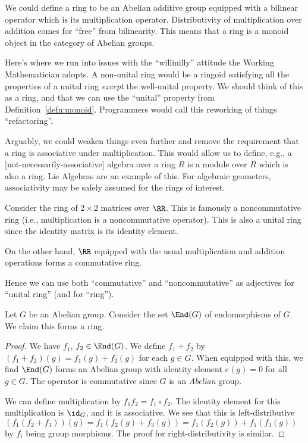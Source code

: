 \begin{remark}[Ring = Abelian additive group + multiplication]
We could define a ring to be an Abelian additive group equipped with a
bilinear operator which is its multiplication operator. Distributivity
of multiplication over addition comes for ``free'' from
bilinearity. This means that a ring is a monoid object in the category
of Abelian groups.
\end{remark}

\begin{remark}
Here's where we run into issues with the ``willinilly'' attitude the
Working Mathematician adopts. A non-unital ring would be a ringoid
satisfying all the properties of a unital ring \emph{except} the
well-unital property. We should think of this as a ring, and that
we can use the ``unital'' property from Definition~\ref{defn:monoid}.
Programmers would call this reworking of things ``refactoring''.

Arguably, we could weaken things even further and remove the
requirement that a ring is associative under multiplication. This
would allow us to define, e.g., a [not-necessarily-associative]
algebra over a ring $R$ is a module over $R$ which is also a ring.
Lie Algebras are an example of this. For algebraic geometers,
associativity may be safely assumed for the rings of interest.
\end{remark}

\begin{example}
Consider the ring of $2\times 2$ matrices over $\RR$. This is famously
a noncommutative ring (i.e., multiplication is a noncommutative operator).
This is also a unital ring since the identity matrix is its identity
element. 

On the other hand, $\RR$ equipped with the usual multiplication and
addition operations forms a commutative ring.

Hence we can use both ``commutative'' and ``noncommutative'' as
adjectives for ``unital ring'' (and for ``ring'').
\end{example}

\begin{example}
Let $G$ be an Abelian group.
Consider the set $\End(G)$ of endomorphisms of $G$. We claim this
forms a ring.

\begin{proof}
We have $f_{1}$, $f_{2}\in\End(G)$. We define $f_{1}+f_{2}$ by
$(f_{1}+f_{2})(g)=f_{1}(g)+f_{2}(g)$ for each $g\in G$. When equipped
with this, we find $\End(G)$ forms an Abelian group with identity
element $e(g)=0$ for all $g\in G$. The operator is commutative since
$G$ is an \emph{Abelian} group.

We can define multiplication by $f_{1}f_{2} = f_{1}\circ f_{2}$. The
identity element for this multiplication is $\id_{G}$, and it is
associative. We see that this is left-distributive
$(f_{1}(f_{2}+f_{3}))(g)=f_{1}(f_{2}(g)+f_{3}(g))=f_{1}(f_{2}(g))+f_{1}(f_{3}(g))$ 
by $f_{i}$ being group morphisms. The proof for right-distributivity
is similar.
\end{proof}
\end{example}

